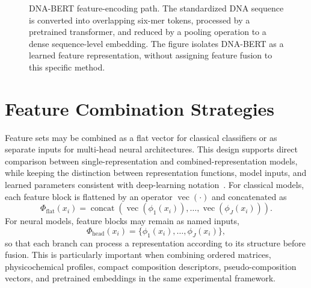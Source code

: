 \begin{figure}[H]
\centering
{}
\caption{DNA-BERT feature-encoding path. The standardized DNA sequence is converted into overlapping six-mer tokens, processed by a pretrained transformer, and reduced by a pooling operation to a dense sequence-level embedding. The figure isolates DNA-BERT as a learned feature representation, without assigning feature fusion to this specific method.}
\label{fig:dnabert-embedding-diagram}
\end{figure}

\section{Feature Combination Strategies}\label{sec:features-combination}

Feature sets may be combined as a flat vector for classical classifiers or as separate inputs for multi-head neural architectures. This design supports direct comparison between single-representation and combined-representation models, while keeping the distinction between representation functions, model inputs, and learned parameters consistent with deep-learning notation~\citep{goodfellow2016deep}. For classical models, each feature block is flattened by an operator $\operatorname{vec}(\cdot)$ and concatenated as
\begin{equation}
\Phi_{\mathrm{flat}}(x_i)=
\operatorname{concat}\left(
\operatorname{vec}(\phi_1(x_i)),\ldots,\operatorname{vec}(\phi_J(x_i))
\right).
\end{equation}
For neural models, feature blocks may remain as named inputs,
\begin{equation}
\Phi_{\mathrm{head}}(x_i)=\{\phi_1(x_i),\ldots,\phi_J(x_i)\},
\end{equation}
so that each branch can process a representation according to its structure before fusion. This is particularly important when combining ordered matrices, physicochemical profiles, compact composition descriptors, pseudo-composition vectors, and pretrained embeddings in the same experimental framework.

